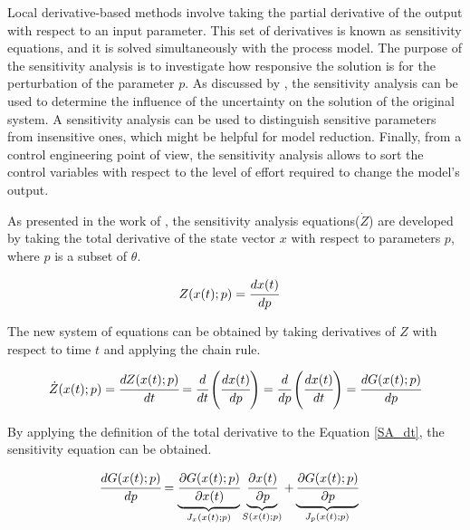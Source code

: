 \documentclass[../Article_Model_Parameters.tex]{subfiles}
\begin{document}
	
	Local derivative-based methods involve taking the partial derivative of the output with respect to an input parameter. This set of derivatives is known as sensitivity equations, and it is solved simultaneously with the process model. The purpose of the sensitivity analysis is to investigate how responsive the solution is for the perturbation of the parameter ${p}$. As discussed by \citet{Dickinson1976}, the sensitivity analysis can be used to determine the influence of the uncertainty on the solution of the original system. A sensitivity analysis can be used to distinguish sensitive parameters from insensitive ones, which might be helpful for model reduction. Finally, from a control engineering point of view, the sensitivity analysis allows to sort the control variables with respect to the level of effort required to change the model's output.
	
	As presented in the work of \citet{Maly1996}, the sensitivity analysis equations(${\dot{Z}}$) are developed by taking the total derivative of the state vector $x$ with respect to parameters $p$, where $p$ is a subset of $\theta$.
	
	{\footnotesize
		\begin{align}
			{Z}({x}(t);{p}) &= \cfrac{d {x}(t)}{d {p}}
	\end{align} }
	
	The new system of equations can be obtained by taking derivatives of $Z$ with respect to time $t$ and applying the chain rule.
	
	{\footnotesize
		\begin{equation} \label{SA_dt} 
			{\dot{Z}}({x}(t);{p})  = \cfrac{d {Z}(x(t);{p})}{d t} = \cfrac{d}{d t} \left( \cfrac{d {x}(t)}{d {p}} \right) = \cfrac{d }{d {p}} \left( \cfrac{d {x}(t)}{d t} \right) = \cfrac{d {G}({x}(t);{p})}{d {p}} 
	\end{equation} }
	
	By applying the definition of the total derivative to the Equation \ref{SA_dt}, the sensitivity equation can be obtained.
	
	{\footnotesize
		\begin{align}		
			\label{SA_eq_full}\cfrac{d {G}({x}(t);{p})}{d {p}} &=  \underbrace{ \cfrac{\partial {G}({x}(t);{p})}{\partial {x}(t)} }_{{J_x}({x}(t);{p})} \underbrace{\cfrac{\partial {x}(t)}{\partial {p}} }_{{S}({x}(t);{p})} + \underbrace{ \cfrac{\partial {G}({x}(t);{p})}{\partial {p}} }_{{J_p}({x}(t);{p})}
	\end{align} }
	
\end{document}
